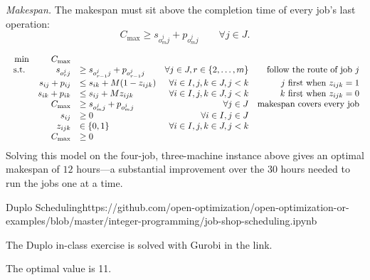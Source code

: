 \emph{Makespan.}
The makespan must sit above the completion time of every job's last operation:
$$
C_{\max} \geq s_{o^{j}_{m} j} + p_{o^{j}_{m} j} \qquad \forall j \in J.
$$

\begin{subequations}
\begin{equation}
\begin{array}{rrlrr}
\min
               & C_{\max} \\
\mbox{ s.t. }
&            s_{o^{j}_{r}j} &  \geq s_{o^{j}_{r-1}j} +p_{o^{j}_{r-1}j} & \forall j \in {J}, r \in \{2,\dots,m\} & \mbox{follow the route of job $j$} \\
             &      s_{ij} + p_{ij}     & \leq s_{ik} + M (1-z_{ijk}) & \forall i \in {I}, j,k \in {J}, j < k & \mbox{$j$ first when $z_{ijk} = 1$} \\
              &     s_{ik} + p_{ik}     & \leq s_{ij} + M z_{ijk} & \forall i \in {I}, j,k \in {J}, j < k & \mbox{$k$ first when $z_{ijk} = 0$}\\
            &       C_{\max}          & \geq s_{o^{j}_{m}j} + p_{o^{j}_{m}j} & \forall j \in {J} & \mbox{makespan covers every job}\\
            &      s_{ij}      & \geq 0 & \forall i \in {I}, j \in {J} \\
           &       z_{ijk}     & \in \{0,1\} & \forall i \in {I}, j,k \in {J}, j < k \\
          &        C_{\max} & \geq 0
              \end{array}
              \end{equation}
\end{subequations}
Solving this model on the four-job, three-machine instance above gives an optimal makespan of $12$ hours---a substantial improvement over the $30$ hours needed to run the jobs one at a time.
\begin{examplewithallcode}{Duplo Scheduling}{}{}{https://github.com/open-optimization/open-optimization-or-examples/blob/master/integer-programming/job-shop-scheduling.ipynb}

The Duplo in-class exercise is solved with Gurobi in the link.

The optimal value is 11.

\begin{center}
\par{}\label{fig:jssp-duplo}%


\par{}\label{fig:jssp-duplo-actual}%

\end{center}
\end{examplewithallcode}

